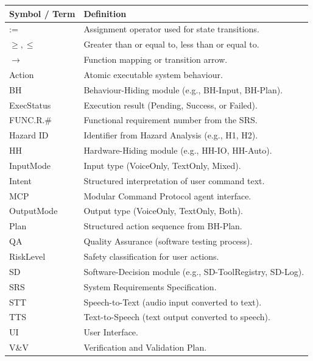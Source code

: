 \documentclass[12pt, titlepage]{article}
\begin{document}
\begin{center}
\renewcommand{\arraystretch}{1.2}
\begin{tabular}{p{3cm} p{11cm}}
\toprule
Symbol / Term & Definition \\
\midrule
:= & Assignment operator used for state transitions.\\
$\geq, \leq$ & Greater than or equal to, less than or equal to.\\
$\rightarrow$ & Function mapping or transition arrow.\\
Action & Atomic executable system behaviour.\\
BH & Behaviour-Hiding module (e.g., BH-Input, BH-Plan).\\
ExecStatus & Execution result (Pending, Success, or Failed).\\
FUNC.R.\# & Functional requirement number from the SRS.\\
Hazard ID & Identifier from Hazard Analysis (e.g., H1, H2).\\
HH & Hardware-Hiding module (e.g., HH-IO, HH-Auto).\\
InputMode & Input type (VoiceOnly, TextOnly, Mixed).\\
Intent & Structured interpretation of user command text.\\
MCP & Modular Command Protocol agent interface.\\
OutputMode & Output type (VoiceOnly, TextOnly, Both).\\
Plan & Structured action sequence from BH-Plan.\\
QA & Quality Assurance (software testing process).\\
RiskLevel & Safety classification for user actions.\\
SD & Software-Decision module (e.g., SD-ToolRegistry, SD-Log).\\
SRS & System Requirements Specification.\\
STT & Speech-to-Text (audio input converted to text).\\
TTS & Text-to-Speech (text output converted to speech).\\
UI & User Interface.\\
V\&V & Verification and Validation Plan.\\
\bottomrule
\end{tabular}
\end{center}

\newpage

\tableofcontents

\newpage
\end{document}
